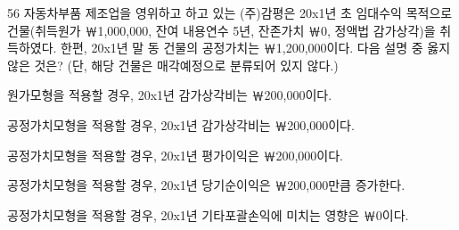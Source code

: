 \begin{question}{56}
자동차부품 제조업을 영위하고 하고 있는 (주)감평은 20x1년 초 임대수익 목적으로 건물(취득원가 ￦1,000,000, 잔여 내용연수 5년, 잔존가치 ￦0, 정액법 감가상각)을 취득하였다. 한편, 20x1년 말 동 건물의 공정가치는 ￦1,200,000이다. 다음 설명 중 옳지 않은 것은? (단, 해당 건물은 매각예정으로 분류되어 있지 않다.)
\begin{choices}
  \item 원가모형을 적용할 경우, 20x1년 감가상각비는 ￦200,000이다.
  \item 공정가치모형을 적용할 경우, 20x1년 감가상각비는 ￦200,000이다.
  \item 공정가치모형을 적용할 경우, 20x1년 평가이익은 ￦200,000이다.
  \item 공정가치모형을 적용할 경우, 20x1년 당기순이익은 ￦200,000만큼 증가한다.
  \item 공정가치모형을 적용할 경우, 20x1년 기타포괄손익에 미치는 영향은 ￦0이다.
\end{choices}
\end{question}
